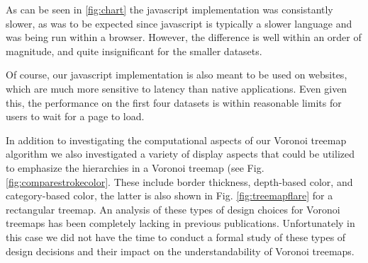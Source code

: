 \documentclass{acm_proc_article-sp} \usepackage{cite}
\begin{document}
As can be seen in \ref{fig:chart} the javascript implementation was
consistantly slower, as was to be expected since javascript is
typically a slower language and was being run within a
browser. However, the difference is well within an order of
magnitude, and quite insignificant for the smaller datasets.

Of course, our javascript implementation is also meant to be used on
websites, which are much more sensitive to latency than native
applications. Even given this, the performance on the first four
datasets is within reasonable limits for users to wait for a page to
load.

In addition to investigating the computational aspects of our Voronoi
treemap algorithm we also investigated a variety of display aspects
that could be utilized to emphasize the hierarchies in a Voronoi
treemap (see Fig. \ref{fig:comparestrokecolor}. These include border
thickness, depth-based color, and category-based color, the latter is
also shown in Fig. \ref{fig:treemapflare} for a rectangular
treemap. An analysis of these types of design choices for Voronoi
treemaps has been completely lacking in previous
publications. Unfortunately in this case we did not have the time to
conduct a formal study of these types of design decisions and their
impact on the understandability of Voronoi treemaps.
\end{document}
